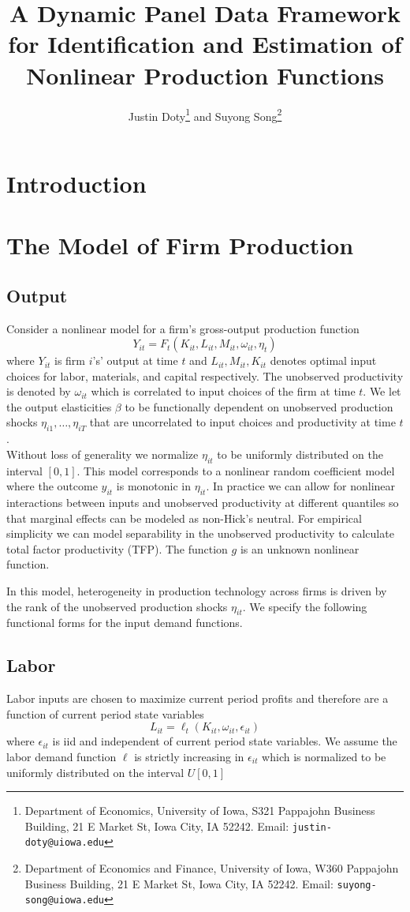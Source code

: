 \documentclass{article}
\title{A Dynamic Panel Data Framework for Identification and Estimation of Nonlinear Production Functions}
\author{Justin Doty\thanks{Department of Economics, University of Iowa, S321 Pappajohn Business Building, 21 E Market St, Iowa City, IA 52242. Email: \texttt{justin-doty@uiowa.edu}} and Suyong Song\thanks{Department of Economics and Finance, University of Iowa, W360 Pappajohn Business Building, 21 E Market St, Iowa City, IA 52242. Email: \texttt{suyong-song@uiowa.edu}}
}
\date{\vspace{-5ex}}
\begin{document}
\maketitle{} 
\section{Introduction}
\section{The Model of Firm Production}

\subsection{Output}
Consider a nonlinear model for a firm's gross-output production function
\begin{equation}\label{modelY}
Y_{it}=F_{t}(K_{it}, L_{it}, M_{it}, \omega_{it}, \eta_{t})
\end{equation}
where $Y_{it}$ is firm $i$'s' output at time $t$ and $L_{it}, M_{it}, K_{it}$ denotes optimal input choices for labor, materials, and capital respectively. The unobserved productivity is denoted by $\omega_{it}$ which is correlated to input choices of the firm at time $t$. We let the output elasticities $\beta$ to be functionally dependent on unobserved production shocks $\eta_{i1},\dots, \eta_{iT}$ that are uncorrelated to input choices and productivity at time $t$.\\

Without loss of generality we normalize $\eta_{it}$ to be uniformly distributed on the interval $[0,1]$. This model corresponds to a nonlinear random coefficient model where the outcome $y_{it}$ is monotonic in $\eta_{it}$. In practice we can allow for nonlinear interactions between inputs and unobserved productivity at different quantiles so that marginal effects can be modeled as non-Hick's neutral. For empirical simplicity we can model separability in the unobserved productivity to calculate total factor productivity (TFP). The function $g$ is an unknown nonlinear function.

In this model, heterogeneity in production technology across firms is driven by the rank of the unobserved production shocks $\eta_{it}$. We specify the following functional forms for the input demand functions.

\subsection{Labor} 
Labor inputs are chosen to maximize current period profits and therefore are a function of current period state variables
\begin{equation} \label{modelL}
L_{it}=\ell_{t}(K_{it}, \omega_{it}, \epsilon_{it})
\end{equation}
where $\epsilon_{it}$ is iid and independent of current period state variables. We assume the labor demand function $\ell$ is strictly increasing in $\epsilon_{it}$ which is normalized to be uniformly distributed on the interval $U[0,1]$
\end{document}
